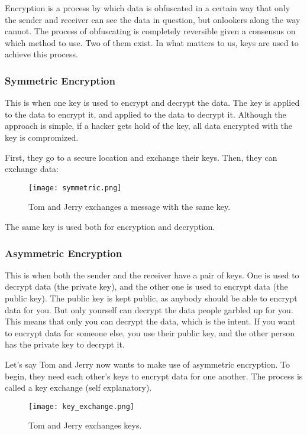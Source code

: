 \documentclass[../main.tex]{subfiles}
\begin{document}
Encryption is a process by which data is obfuscated in a certain way that only the sender and receiver can see the data in question, but onlookers along the way cannot. The process of obfuscating is completely reversible given a consensus on which method to use. Two of them exist. In what matters to us, keys are used to achieve this process.

\subsubsection{Symmetric Encryption}

This is when one key is used to encrypt and decrypt the data. The key is applied to the data to encrypt it, and applied to the data to decrypt it. Although the approach is simple, if a hacker gets hold of the key, all data encrypted with the key is compromized.

First, they go to a secure location and exchange their keys. Then, they can exchange data:

\begin{figure}[H]
    \centering
    \texttt{[image: symmetric.png]}
    \caption{Tom and Jerry exchanges a message with the same key.}
    \label{fig:symmetric}
\end{figure}

The same key is used both for encryption and decryption.

\subsubsection{Asymmetric Encryption}

This is when both the sender and the receiver have a pair of keys. One is used to decrypt data (the private key), and the other one is used to encrypt data (the public key). The public key is kept public, as anybody should be able to encrypt data for you. But only yourself can decrypt the data people garbled up for you. This means that only you can decrypt the data, which is the intent. If you want to encrypt data for someone else, you use their public key, and the other person has the private key to decrypt it.

Let's say Tom and Jerry now wants to make use of asymmetric encryption. To begin, they need each other's keys to encrypt data for one another. The process is called a key exchange (self explanatory).

\begin{figure}[H]
    \centering
    \texttt{[image: key\_exchange.png]}
    \caption{Tom and Jerry exchanges keys.}
    \label{fig:key_exchange}
\end{figure}
\end{document}
